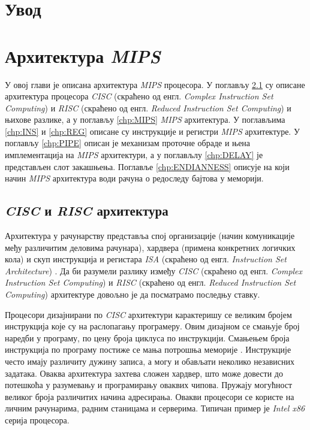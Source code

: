 \documentclass[12pt,oneside]{memoir}
\begin{document}
\frontmatter

\naslovna

\komisija

\posveta{}

\apstrakt

\tableofcontents*

\mainmatter

\chapter{Увод}

\chapter{Архитектура \textit{MIPS}}

У овој глави је описана архитектура \textit{MIPS} процесора. У поглављу \ref{chp:CR} су описане архитектура
процесора \textit{CISC} (скраћено од енгл. \textit{Complex Instruction Set Computing}) и \textit{RISC} (скраћено од
енгл. \textit{Reduced Instruction Set Computing}) и њихове разлике, а у поглављу \ref{chp:MIPS} \textit{MIPS}
архитектура. У поглављима \ref{chp:INS} и \ref{chp:REG} описане су инструкције и регистри \textit{MIPS} архитектуре.
У поглављу \ref{chp:PIPE} описан је механизам проточне обраде и њена имплементација на \textit{MIPS} архитектури, а у
поглављлу \ref{chp:DELAY} је представљен слот закашњења. Поглавље \ref{chp:ENDIANNESS} описује на који начин \textit{MIPS}
архитектура води рачуна о редоследу бајтова у меморији.

\section{\textit{CISC} и \textit{RISC} архитектура} \label{chp:CR}

Архитектура у рачунарству представља спој организације (начин комуникације међу различитим деловима рачунара),
хардвера (примена конкретних логичких кола) и скуп инструкција и регистара \textit{ISA} (скраћено од енгл.
\textit{Instruction Set Architecture}) \cite{ARCH}. Да би разумели разлику између \textit{CISC} (скраћено од енгл.
\textit{Complex Instruction Set Computing}) и \textit{RISC} (скраћено од енгл. \textit{Reduced Instruction Set
Computing}) архитектуре довољно је да посматрамо последњу ставку.

Процесори дизајнирани по \textit{CISC} архитектури карактеришу се великим бројем инструкција које су на раслопагању
програмеру. Овим дизајном се смањује број наредби у програму, по цену броја циклуса по инструкцији. Смањењем броја
инструкција по програму постиже се мања потрошња меморије \cite{CR}. Инструкције често имају различиту дужину
записа, а могу и обављати неколико независних задатака. Оваква архитектура захтева сложен хардвер, што може довести
до потешкоћа у разумевању и програмирању оваквих чипова. Пружају могућност великог броја различитих начина
адресирања. Овакви процесори се користе на личним рачунарима, радним станицама и серверима. Типичан пример је
\textit{Intel x86} серија процесора.
\end{document}
